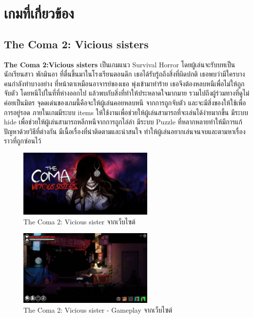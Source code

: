 \section{เกมที่เกี่ยวข้อง}
\subsection{The Coma 2: Vicious sisters}
\subsubitem \textbf{The Coma 2:Vicious sisters} \cite{the-coma-2:theory} 
เป็นเกมแนว Survival Horror โดยผู้เล่นจะรับบทเป็นนักเรียนสาว พักมินอา ที่ตื่นขึ้นมาในโรงเรียนตอนดึก 
เธอได้รับรู้ถถึงสิ่งที่ผิดปกติ เธอพบว่ามีใครบางคนกำลังทำบางอย่าง ที่หน้าตาเหมือนอาจารย์ของเธอ พุ่งเข้ามาทำร้าย 
เธอจึงต้องหลบหนีเพื่อไม่ให้ถูกจับตัว โดยหนีไปในที่ที่ห่างออกไป แล้วพบกับสิ่งที่ทำให้ประหลาดใจมากมาย 
รวมไปถึงผู้ร่วมทางที่ดูไม่ค่อยเป็นมิตร จุดดเด่นของเกมนี้คือจะให้ผู้เล่นคอยหลบหนี 
จากการถูกจับตัว และจะมีสิ่งของให้ใช้เพื่อการอยู่รอด ภายในเกมมีระบบ items ให้ใช้งานเพื่อช่วยให้ผู้เล่นสามารถที่จะเล่นได้ง่ายมากขึ้น 
มีระบบ hide เพื่อช่วยให้ผู้เล่นสามารถหลีกหนีจากการถูกไล่ล่า มีระบบ Puzzle ที่หลากหลายทำให้มีการแก้ปัญหาด้วยวิธีที่ต่างกัน 
มีเนื้อเรื่องที่น่าติดตามและน่าสนใจ ทำให้ผู้เล่นอยากเล่นจนจบและตามหาเรื่องราวที่ถูกซ่อนไว้ 
\begin{figure}[h]
  \centering
  \includegraphics[width=0.6\textwidth, height=0.2\textheight]{Images/H2x1_NSwitchDS_TheComa2ViciousSisters.jpg}
  \caption{The Coma 2: Vicious sister จากเว็บไซต์}\label{TheComa2ViciousSisters}
\end{figure}

\begin{figure}[h]
  \centering
  \includegraphics[width=0.6\textwidth, height=0.2\textheight]{Images/the-coma-2-vicious-sisters-full-game-all-notes-no-commentary-1-6-28-screenshot_feature.png}
  \caption{The Coma 2: Vicious sister - Gameplay จากเว็บไซต์}\label{TheComa2ViciousSistersWalkThrough}
\end{figure}

